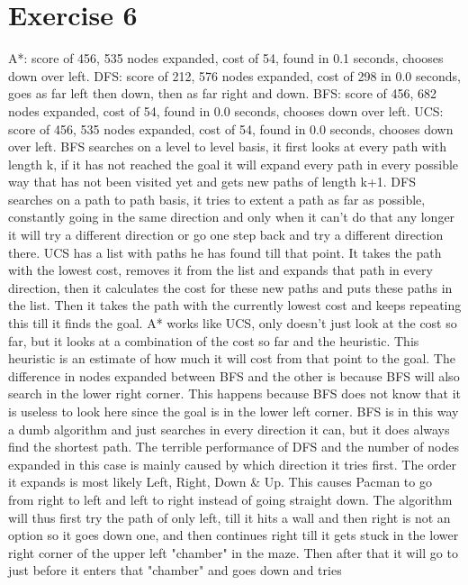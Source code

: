 \section{Exercise 6}
A*:  score of 456, 535 nodes expanded, cost of 54, found in 0.1 seconds, chooses down over left.
DFS: score of 212, 576 nodes expanded, cost of 298 in 0.0 seconds, goes as far left then down, then as far right and down.
BFS: score of 456, 682 nodes expanded, cost of 54, found in 0.0 seconds, chooses down over left.
UCS: score of 456, 535 nodes expanded, cost of 54, found in 0.0 seconds, chooses down over left.
BFS searches on a level to level basis, it first looks at every path with length k, if it has not reached the goal 
it will expand every path in every possible way that has not been visited yet and gets new paths of length k+1.
DFS searches on a path to path basis, it tries to extent a path as far as possible, constantly going in the same direction
and only when it can't do that any longer it will try a different direction or go one step back and try a different direction there.
UCS has a list with paths he has found till that point. It takes the path with the lowest cost, removes it from the list 
and expands that path in every direction, then it calculates the cost for these new paths and puts these paths in the list. 
Then it takes the path with the currently lowest cost and keeps repeating this till it finds the goal.
A* works like UCS, only doesn't just look at the cost so far, but it looks at a combination of the cost so far and the heuristic.
This heuristic is an estimate of how much it will cost from that point to the goal.
The difference in nodes expanded between BFS and the other is because BFS will also search in the lower right corner. 
This happens because BFS does not know that it is useless to look here since the goal is in the lower left corner.
BFS is in this way a dumb algorithm and just searches in every direction it can, but it does always find the shortest path.
The terrible performance of DFS and the number of nodes expanded in this case is mainly caused by which direction it tries first. 
The order it expands is most likely Left, Right, Down & Up. This causes Pacman to go from right to left and left to right
instead of going straight down. The algorithm will thus first try the path of only left, till it hits a wall and then right 
is not an option so it goes down one, and then continues right till it gets stuck in the lower right corner of the upper left "chamber"
in the maze. Then after that it will go to just before it enters that "chamber" and goes down and tries 
